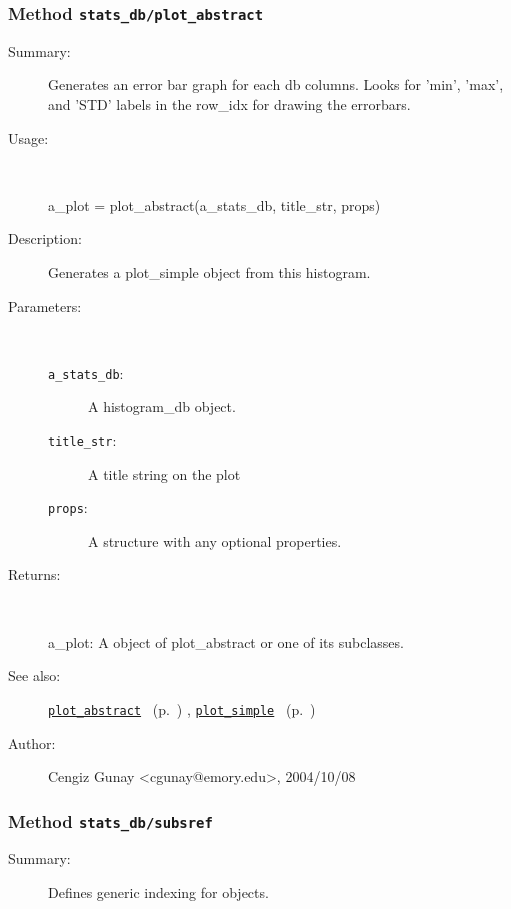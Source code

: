 \subsubsection[Method \texttt{plot\_abstract}]{Method \texttt{stats\_db/plot\_abstract}}%
%
\label{ref_stats_db__plot_abstract}%
\hypertarget{ref_stats_db__plot_abstract}{}%
\begin{description}
\item[Summary:]Generates an error bar graph for each db columns. Looks for 'min', 'max', and 'STD' labels in the row\_idx for drawing the errorbars.
%
\item[Usage:]~%
\begin{lyxcode}%
a\_plot = plot\_abstract(a\_stats\_db, title\_str, props)
%
\end{lyxcode}%
%
\item[Description:]%
Generates a plot\_simple object from this histogram.
\item[Parameters:]~
\begin{description}%
\item[\texttt{a\_stats\_db}:]
 A histogram\_db object.
\item[\texttt{title\_str}:]
 A title string on the plot
\item[\texttt{props}:]
 A structure with any optional properties.
\end{description}%
%
\item[Returns:]~

	a\_plot: A object of plot\_abstract or one of its subclasses.
%
%
\item[See also:]%
\hyperlink{ref_plot_abstract}{\texttt{plot\_abstract}}%
\ (p.~\pageref{ref_plot_abstract})%
%
, \hyperlink{ref_plot_simple}{\texttt{plot\_simple}}%
\ (p.~\pageref{ref_plot_simple})%
%
%
\item[Author:]%
Cengiz Gunay <cgunay@emory.edu>, 2004/10/08%
\end{description}
\methodline%
\subsubsection[Method \texttt{subsref}]{Method \texttt{stats\_db/subsref}}%
%
\label{ref_stats_db__subsref}%
\hypertarget{ref_stats_db__subsref}{}%
\begin{description}
\item[Summary:]Defines generic indexing for objects.
%
%
%
%
%
%
%
%
\end{description}
\methodline%

